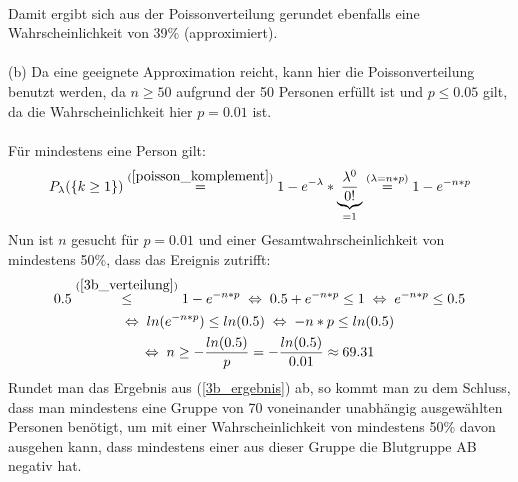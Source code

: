 \documentclass[10pt,a4paper]{article}
\begin{document}
		\\
		Damit ergibt sich aus der Poissonverteilung gerundet ebenfalls eine Wahrscheinlichkeit von 39\% (approximiert).
		\\
		\\
		(b) \quad Da eine geeignete Approximation reicht, kann hier die Poissonverteilung benutzt werden, da $n \ge 50$ aufgrund der 50 Personen erfüllt ist und $p \le 0.05$ gilt, da die Wahrscheinlichkeit hier $p = 0.01$ ist.
		\\
		\\
		Für mindestens eine Person gilt:
		\begin{equation}
			\label{3b_verteilung}
			P_{\lambda}(\{k \ge 1\})
			\overset{(\ref{poisson_komplement})}{=}
			1 - e^{-\lambda} * \underbrace{\frac{\lambda^{0}}{0!}}_{\substack{=1}}
			\overset{(\lambda = n*p)}{=}
			1 - e^{-n*p} 
		\end{equation}
		Nun ist $n$ gesucht für $p = 0.01$ und einer Gesamtwahrscheinlichkeit von mindestens 50\%, dass das Ereignis zutrifft:
		\begin{gather}
			\nonumber
			0.5 \overset{(\ref{3b_verteilung})}{\le} 1 - e^{-n*p}
			\;\Leftrightarrow\; 0.5 + e^{-n*p} \le 1
			\;\Leftrightarrow\; e^{-n*p} \le 0.5
			\\
			\nonumber
			\Leftrightarrow\;   ln(e^{-n*p}) \le ln(0.5)
			\;\Leftrightarrow\; -n*p \le ln(0.5)
			\\
			\label{3b_ergebnis}
			\Leftrightarrow\;   n \ge -\frac{ln(0.5)}{p}
			= -\frac{ln(0.5)}{0.01} \approx 69.31
		\end{gather}
		Rundet man das Ergebnis aus (\ref{3b_ergebnis}) ab, so kommt man zu dem Schluss, dass man mindestens eine Gruppe von 70 voneinander unabhängig ausgewählten Personen benötigt, um mit einer Wahrscheinlichkeit von mindestens 50\% davon ausgehen kann, dass mindestens einer aus dieser Gruppe die Blutgruppe AB negativ hat.
		


		\begin{flushright}
			\text{$\Box$}
		\end{flushright}
		
\end{document}
